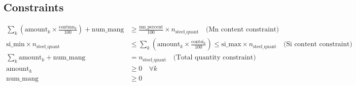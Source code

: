 \documentclass{article}
\begin{document}
\subsection*{Constraints}
\begin{align*}
    \sum_k \left( \text{amount}_k \times \frac{\text{contmn}_k}{100} \right) + \text{num\_mang} &\geq \frac{\text{mn\_percent}}{100} \times n_{\text{steel\_quant}} \quad \text{(Mn content constraint)} \\
    \text{si\_min} \times n_{\text{steel\_quant}} &\leq \sum_k \left( \text{amount}_k \times \frac{\text{contsi}_k}{100} \right) \leq \text{si\_max} \times n_{\text{steel\_quant}} \quad \text{(Si content constraint)} \\
    \sum_k \text{amount}_k + \text{num\_mang} &= n_{\text{steel\_quant}} \quad \text{(Total quantity constraint)} \\
    \text{amount}_k &\geq 0 \quad \forall k \\
    \text{num\_mang} &\geq 0
\end{align*}
\end{document}
